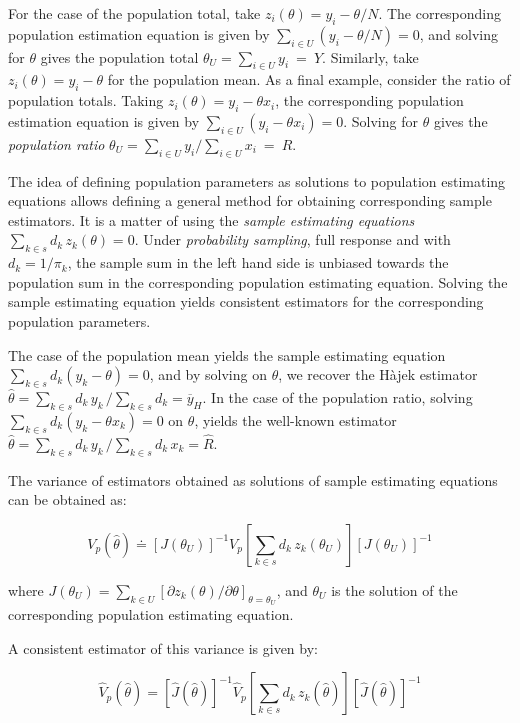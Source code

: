 \documentclass[
  12pt,
]{book}
\begin{document}
For the case of the population total, take \(z_i(\theta) = y_i - \theta / N\). The corresponding population estimation equation is given by \(\sum _{i \in U} (y_i - \theta / N) = 0\), and solving for \(\theta\) gives the population total \(\theta_U = \sum _{i \in U} y_i \ = \ Y\). Similarly, take \(z_i(\theta) = y_i - \theta\) for the population mean. As a final example, consider the ratio of population totals. Taking \(z_i(\theta) = y_i - \theta x_i\), the corresponding population estimation equation is given by \(\sum _{i \in U} (y_i - \theta x_i) = 0\). Solving for \(\theta\) gives the \emph{population ratio} \(\theta_U = \sum _{i \in U} y_i / \sum _{i \in U} x_i \ = \ R\).

The idea of defining population parameters as solutions to population estimating equations allows defining a general method for obtaining corresponding sample estimators. It is a matter of using the \emph{sample estimating equations} \(\sum _{k \in s} d_k \, z_k (\theta) = 0\). Under \emph{probability sampling}, full response and with \(d_k = 1 / \pi_k\), the sample sum in the left hand side is unbiased towards the population sum in the corresponding population estimating equation. Solving the sample estimating equation yields consistent estimators for the corresponding population parameters.

The case of the population mean yields the sample estimating equation \(\sum _{k \in s} d_k (y_k - \theta) = 0\), and by solving on \(\theta\), we recover the Hàjek estimator \(\widehat \theta = \sum _{k \in s} d_k \, y_k \, / \sum _{k \in s} d_k = \overline y_H\). In the case of the population ratio, solving \(\sum _{k \in s} d_k (y_k - \theta x_k) = 0\) on \(\theta\), yields the well-known estimator \(\widehat \theta = \sum _{k \in s} d_k \, y_k \, / \sum _{k \in s} d_k \, x_k = \widehat R\).

The variance of estimators obtained as solutions of sample estimating equations can be obtained as:

\[
V_p (\widehat \theta) \doteq \left[ J (\theta_U) \right] ^{-1} V_p \left[ \sum _{k \in s} d_k \, z_k (\theta_U) \right] \left[ J (\theta_U) \right] ^{-1}
\]

where \(J (\theta_U) = \sum _{k \in U} \left[ \partial{z_k (\theta)} / \partial \theta \right]_{\theta = \theta_U}\), and \(\theta_U\) is the solution of the corresponding population estimating equation.

A consistent estimator of this variance is given by:

\[
\widehat V_p (\widehat \theta) = \left[ \widehat J ( \widehat \theta) \right] ^{-1} \widehat V_p \left[ \sum _{k \in s} d_k \, z_k (\widehat \theta)\right] \left[ \widehat J ( \widehat \theta) \right] ^{-1}
\]
\end{document}
